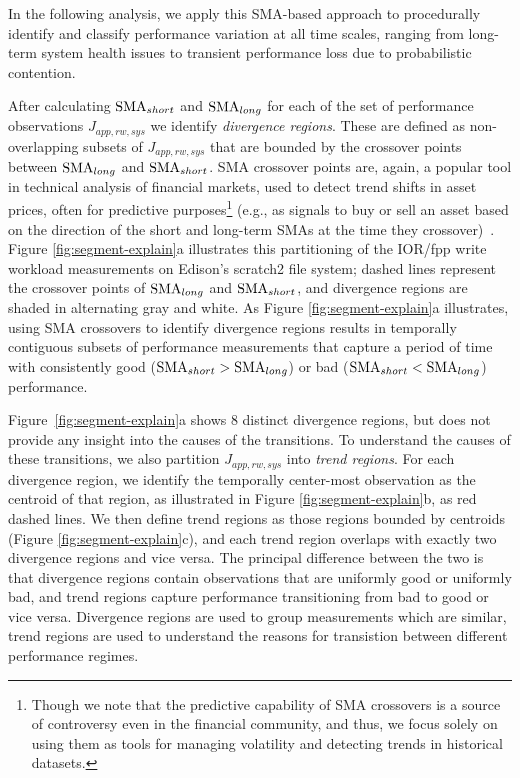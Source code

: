 In the following analysis, we apply this SMA-based approach to procedurally identify and classify performance variation at all time scales, ranging from long-term system health issues to transient performance loss due to probabilistic contention.



After calculating $\textup{SMA}_{short}$ and $\textup{SMA}_{long}$ for each of the set of performance observations $J_{app, rw, sys}$ we identify \emph{divergence regions}. These are defined as non-overlapping subsets of $J_{app, rw, sys}$ that are bounded by the crossover points between $\textup{SMA}_{long}$ and $\textup{SMA}_{short}$.
SMA crossover points are, again, a popular tool in technical analysis of financial markets, used to detect trend shifts in asset prices, often for predictive purposes\footnote{Though we note that the predictive capability of SMA crossovers is a source of controversy even in the financial community, and thus, we focus solely on using them as tools for managing volatility and detecting trends in historical datasets.} (e.g., as signals to buy or sell an asset based on the direction of the short and long-term SMAs at the time they crossover)~\cite{brock1992simple}.
Figure \ref{fig:segment-explain}a illustrates this partitioning of the IOR/fpp write workload measurements on Edison's scratch2 file system;
dashed lines represent the crossover points of $\textup{SMA}_{long}$ and $\textup{SMA}_{short}$, and divergence regions are shaded in alternating gray and white.
As Figure \ref{fig:segment-explain}a illustrates, using SMA crossovers to identify divergence regions results in temporally contiguous subsets of performance measurements that capture a period of time with consistently good (${\textup{SMA}_{short} > \textup{SMA}_{long}}$) or bad (${\textup{SMA}_{short} < \textup{SMA}_{long}}$) performance.

Figure~\ref{fig:segment-explain}a shows 8 distinct divergence regions, but does not provide any insight into the causes of the transitions. To understand the causes of these transitions, we also partition $J_{app, rw, sys}$ into \emph{trend regions}.
For each divergence region, we identify the temporally center-most observation as the centroid of that region, as illustrated in Figure \ref{fig:segment-explain}b, as red dashed lines.
We then define trend regions as those regions bounded by centroids (Figure \ref{fig:segment-explain}c), and each trend region overlaps with exactly two divergence regions and vice versa.
The principal difference between the two is that divergence regions contain observations that are uniformly good or uniformly bad, and trend regions capture performance transitioning from bad to good or vice versa. Divergence regions are used to group measurements which are similar, trend regions are used to understand the reasons for transistion between different performance regimes.




